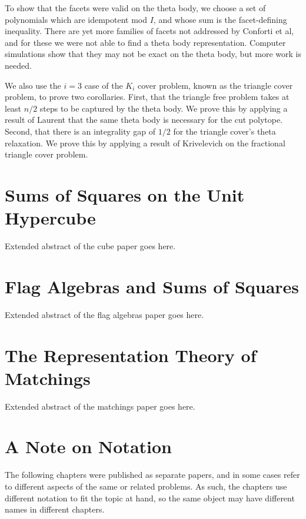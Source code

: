 To show that the facets were valid on the theta body, we choose a set of 
polynomials which are idempotent mod $I$, and whose sum is the facet-defining
inequality. There are yet more families of facets not addressed by Conforti 
et al, and for these we were not able to find a theta body representation. 
Computer simulations show that they may not be exact on the theta body, but
more work is needed.

We also use the $i=3$ case of the $K_i$ cover problem, known as the triangle
cover problem, to prove two corollaries. First, that the triangle free problem
takes at least $n/2$ steps to be captured by the theta body. We prove this
by applying a result of Laurent that the same theta body is necessary for
the cut polytope. Second, that there is an integrality gap of $1/2$ for the
triangle cover's theta relaxation. We prove this by applying a result of 
Krivelevich on the fractional triangle cover problem.

\section{Sums of Squares on the Unit Hypercube}

Extended abstract of the cube paper goes here.

\section{Flag Algebras and Sums of Squares}

Extended abstract of the flag algebras paper goes here.

\section{The Representation Theory of Matchings}

Extended abstract of the matchings paper goes here.

\section{A Note on Notation}
The following chapters were published as separate papers, and in some cases
refer to different aspects of the same or related problems. As such, the 
chapters use different notation to fit the topic at hand, so the same object
may have different names in different chapters.
